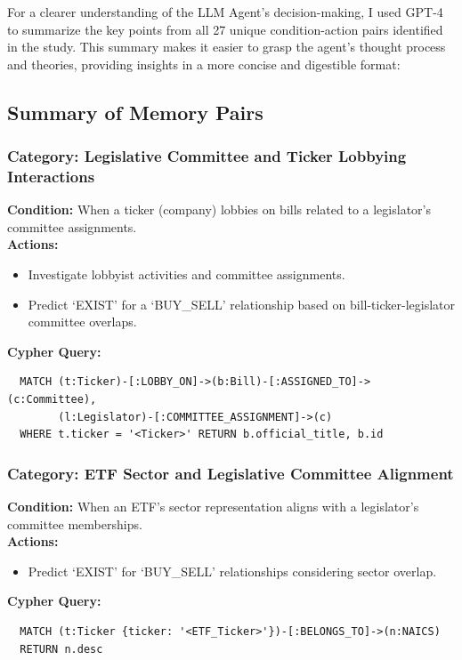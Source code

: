 \documentclass[15pt,letterpaper]{article}
\begin{document}
For a clearer understanding of the LLM Agent's decision-making, I used GPT-4 to summarize the key points from all 27 unique condition-action pairs identified in the study. This summary makes it easier to grasp the agent's thought process and theories, providing insights in a more concise and digestible format: 

\vspace{5mm} %

\begin{mdframed}
  \subsection*{Summary of Memory Pairs}
  
  \subsubsection*{Category: Legislative Committee and Ticker Lobbying Interactions}
  \textbf{Condition:} When a ticker (company) lobbies on bills related to a legislator's committee assignments.\\
  \textbf{Actions:} 
  \begin{itemize}
      \item Investigate lobbyist activities and committee assignments.
      \item Predict `EXIST' for a `BUY\_SELL' relationship based on bill-ticker-legislator committee overlaps.
  \end{itemize}
  \textbf{Cypher Query:} 
  \begin{verbatim}
  MATCH (t:Ticker)-[:LOBBY_ON]->(b:Bill)-[:ASSIGNED_TO]->(c:Committee),
        (l:Legislator)-[:COMMITTEE_ASSIGNMENT]->(c)
  WHERE t.ticker = '<Ticker>' RETURN b.official_title, b.id
  \end{verbatim}
  
  \subsubsection*{Category: ETF Sector and Legislative Committee Alignment}
  \textbf{Condition:} When an ETF's sector representation aligns with a legislator's committee memberships.
  \\ \textbf{Actions:}
  \begin{itemize}
      \item Predict `EXIST' for `BUY\_SELL' relationships considering sector overlap.
  \end{itemize}
  \textbf{Cypher Query:} 
  \begin{verbatim}
  MATCH (t:Ticker {ticker: '<ETF_Ticker>'})-[:BELONGS_TO]->(n:NAICS)
  RETURN n.desc
  \end{verbatim}
  

\end{mdframed}
\end{document}
